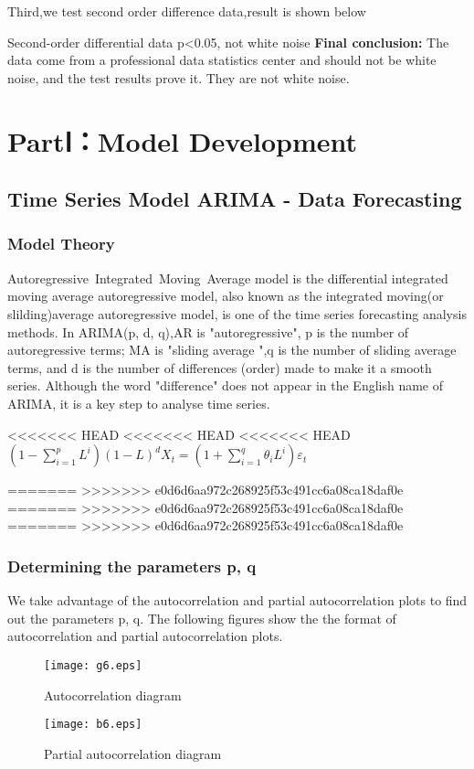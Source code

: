 \documentclass{mcmthesis}
\begin{document}
Third,we test second order difference data,result is shown below

Second-order differential data p<0.05, not white noise
\textbf{Final conclusion: }
The data come from a professional data statistics center and should not be white noise, and the test results prove it. They are not white noise.


\section{PartⅠ：Model Development }
\subsection{Time Series Model ARIMA - Data Forecasting }
\subsubsection{Model Theory}
Autoregressive Integrated Moving Average model is the differential integrated moving average autoregressive model, 
also known as the integrated moving(or slilding)average autoregressive model, 
is one of the time series forecasting analysis methods. 
In ARIMA(p, d, q),AR is "autoregressive", p is the number of autoregressive terms;
MA is "sliding average ",q is the number of sliding average terms, and d is the number of differences (order) made to make it a smooth series.
Although the word "difference" does not appear in the English name of ARIMA, it is a key step to analyse time series.

<<<<<<< HEAD
<<<<<<< HEAD
<<<<<<< HEAD
$\left(1-\sum_{i=1}^{p} L^i \right)(1-L)^d X_t=\left(1+\sum_{i=1}^{q}\theta_i L^i \right)\varepsilon_t$

=======
>>>>>>> e0d6d6aa972c268925f53c491cc6a08ca18daf0e
=======
>>>>>>> e0d6d6aa972c268925f53c491cc6a08ca18daf0e
=======
>>>>>>> e0d6d6aa972c268925f53c491cc6a08ca18daf0e
\subsubsection{Determining the parameters p, q }
We take advantage of the autocorrelation and partial autocorrelation plots to find out the parameters p, q.
The following figures show the the format of autocorrelation and partial autocorrelation plots.
\begin{figure}[!h]
  \centering 
  \texttt{[image: g6.eps]}
  \caption{Autocorrelation diagram}
  \texttt{[image: b6.eps]}
  \caption{Partial autocorrelation diagram} \label{fig6}
\end{figure}
\end{document}
